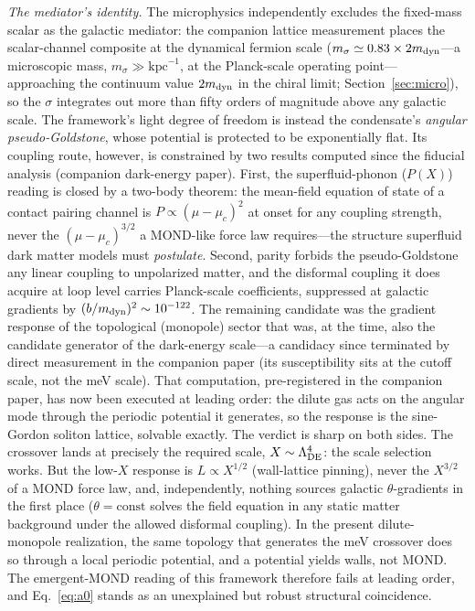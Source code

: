 \documentclass[11pt,a4paper]{article}
\begin{document}
\emph{The mediator's identity.}  The microphysics independently
excludes the fixed-mass scalar as the galactic mediator: the
companion lattice measurement places the scalar-channel composite
at the dynamical fermion scale ($m_\sigma \simeq 0.83 \times
2m_{\rm dyn}$---a microscopic mass, $m_\sigma \gg \mathrm{kpc}^{-1}$,
at the Planck-scale operating point---
approaching the continuum value $2m_{\rm dyn}$ in the chiral
limit; Section~\ref{sec:micro}), so the $\sigma$ integrates out
more than fifty orders of magnitude above any galactic scale.
The framework's light degree of freedom is instead the
condensate's \emph{angular pseudo-Goldstone}, whose potential is
protected to be exponentially flat.  Its coupling route, however,
is constrained by two results computed since the fiducial analysis
(companion dark-energy paper).  First, the superfluid-phonon
($P(X)$) reading is closed by a two-body theorem: the mean-field
equation of state of a contact pairing channel is
$P \propto (\mu-\mu_c)^2$ at onset for any coupling strength,
never the $(\mu-\mu_c)^{3/2}$ a MOND-like force law requires---the
structure superfluid dark matter models
\cite{Berezhiani:2015bqa} must \emph{postulate}.  Second, parity
forbids the pseudo-Goldstone any linear coupling to unpolarized
matter, and the disformal coupling it does acquire at loop level
carries Planck-scale coefficients, suppressed at galactic gradients
by $(b/m_{\rm dyn})^2 \sim 10^{-122}$.
The remaining candidate was the gradient response of the
topological (monopole) sector that was, at the time, also the
candidate generator of the dark-energy scale---a candidacy since
terminated by direct measurement in the companion paper (its
susceptibility sits at the cutoff scale, not the meV scale).  That
computation, pre-registered in the companion paper, has now been
executed at leading order: the dilute gas acts on the angular mode
through the periodic potential it generates, so the response is the
sine-Gordon soliton lattice, solvable exactly.  The verdict is sharp
on both sides.  The crossover lands at precisely the required scale,
$X \sim \Lambda_{\rm DE}^4$: the scale selection works.  But the
low-$X$ response is $L \propto X^{1/2}$ (wall-lattice pinning),
never the $X^{3/2}$ of a MOND force law, and, independently, nothing
sources galactic $\theta$-gradients in the first place
($\theta = \mathrm{const}$ solves the field equation in any static
matter background under the allowed disformal coupling).  In the
present dilute-monopole realization, the same topology that
generates the meV crossover does so through a local periodic
potential, and a potential yields walls, not MOND.  The
emergent-MOND reading of this framework therefore fails at leading
order, and Eq.~\eqref{eq:a0} stands as an unexplained but robust
structural coincidence.
\end{document}
